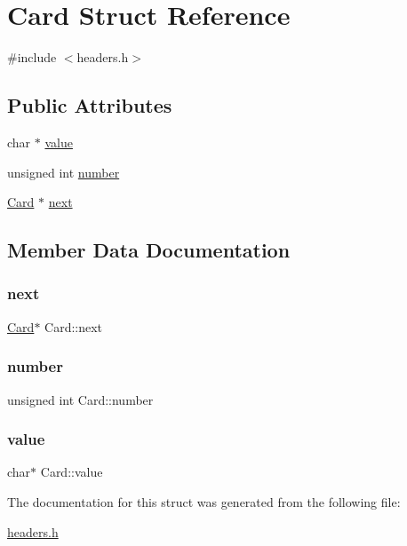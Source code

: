 \hypertarget{structCard}{}\section{Card Struct Reference}
\label{structCard}


{\ttfamily \#include $<$headers.\+h$>$}

\subsection*{Public Attributes}
\begin{DoxyCompactItemize}
\item 
char $\ast$ \mbox{\hyperlink{structCard_a6508919cdf027c25cd243a2074ff7afe}{value}}
\item 
unsigned int \mbox{\hyperlink{structCard_a1a5484c5bfff2074ae1c582e9c677333}{number}}
\item 
\mbox{\hyperlink{structCard}{Card}} $\ast$ \mbox{\hyperlink{structCard_a67f6ef6c170df8e2bc67cd74e3af714e}{next}}
\end{DoxyCompactItemize}


\subsection{Member Data Documentation}
\mbox{\label{structCard_a67f6ef6c170df8e2bc67cd74e3af714e}} 
\subsubsection{\texorpdfstring{next}{next}}
{\footnotesize\ttfamily \mbox{\hyperlink{structCard}{Card}}$\ast$ Card\+::next}

\mbox{\label{structCard_a1a5484c5bfff2074ae1c582e9c677333}} 
\subsubsection{\texorpdfstring{number}{number}}
{\footnotesize\ttfamily unsigned int Card\+::number}

\mbox{\label{structCard_a6508919cdf027c25cd243a2074ff7afe}} 
\subsubsection{\texorpdfstring{value}{value}}
{\footnotesize\ttfamily char$\ast$ Card\+::value}



The documentation for this struct was generated from the following file\+:\begin{DoxyCompactItemize}
\item 
\mbox{\hyperlink{headers_8h}{headers.\+h}}\end{DoxyCompactItemize}
